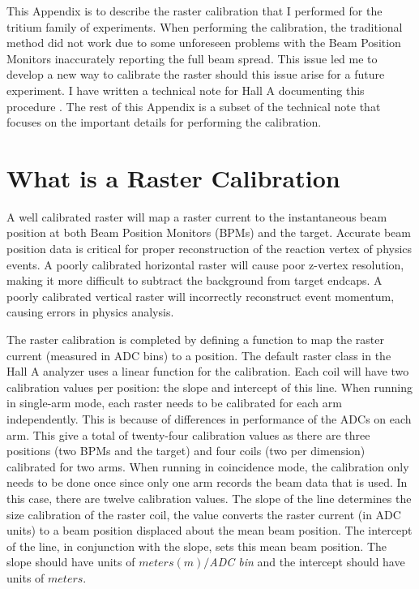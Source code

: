 This Appendix is to describe the raster calibration that I performed for the tritium family of experiments. When performing the calibration, the traditional method did not work due to some unforeseen problems with the Beam Position Monitors inaccurately reporting the full beam spread. This issue led me to develop a new way to calibrate the raster should this issue arise for a future experiment. I have written a technical note for Hall A documenting this procedure \cite{MyRaster}. The rest of this Appendix is a subset of the technical note that focuses on the important details for performing the calibration.

\label{app:raster_cal}
\section{What is a Raster Calibration} \label{what}

A well calibrated raster will map a raster current to the instantaneous beam position at both Beam Position Monitors (BPMs) and the target. Accurate beam position data is critical for proper reconstruction of the reaction vertex of physics events. A poorly calibrated horizontal raster will cause poor z-vertex resolution, making it more difficult to subtract the background from target endcaps. A poorly calibrated vertical raster will incorrectly reconstruct event momentum, causing errors in physics analysis.


The raster calibration is completed by defining a function to map the raster current (measured in ADC bins) to a position. The default raster class in the Hall A analyzer uses a linear function for the calibration. Each coil will have two calibration values per position: the slope and intercept of this line. When running in single-arm mode, each raster needs to be calibrated for each arm independently. This is because of differences in performance of the ADCs on each arm. This give a total of twenty-four calibration values as there are three positions (two BPMs and the target) and four coils (two per dimension) calibrated for two arms. When running in coincidence mode, the calibration only needs to be done once since only one arm records the beam data that is used. In this case, there are twelve calibration values. The slope of the line determines the size calibration of the raster coil, the value converts the raster current (in ADC units) to a beam position displaced about the mean beam position. The intercept of the line, in conjunction with the slope, sets this mean beam position. The slope should have units of $meters(m)/$\textit{ADC bin} and the intercept should have units of $meters$.

